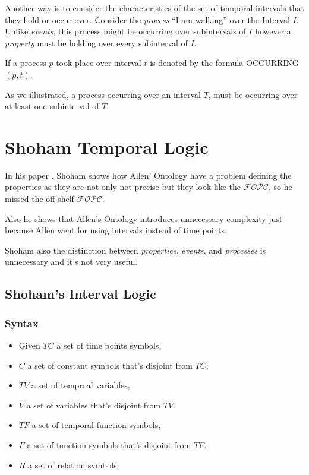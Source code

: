 Another way is to consider the characteristics of the set of temporal intervals that they hold or occur over.
Consider the \textit{process} ``I am walking'' over the Interval $I$. Unlike \textit{events}, this process might be occurring over subintervals of $I$ however a \textit{property} must be holding over every subinterval of $I$.


If a process $p$ took place over interval $t$ is denoted by the formula OCCURRING$(p,t)$.


As we illustrated, a process occurring over an interval $T$, must be occurring over at least one subinterval of $T$.

\section{Shoham Temporal Logic}

In his paper \cite{shoham1988temporal}.
Shoham shows how Allen' Ontology have a problem defining the properties as they are not only not precise but they look like the $\mathcal{FOPC}$, so he missed the-off-shelf $\mathcal{FOPC}$.

Also he shows that Allen's Ontology introduces unnecessary complexity just because Allen went for using intervals instead of time points.

Shoham also the distinction between \textit{properties}, \textit{events}, and \textit{processes} is unnecessary and it's not very useful.


\subsection{Shoham's Interval Logic}
\subsubsection{Syntax}
\begin{itemize}
	\item Given $TC$ a set of time points symbols,
	\item $C$ a set of constant symbols that's disjoint from $TC$;
	\item $TV$ a set of temproal variables,
	\item $V$ a set of variables that's disjoint from $TV$.
	\item $TF$ a set of temporal function symbols,
	\item $F$ a set of function symbols that's disjoint from $TF$.
	\item $R$ a set of relation symbols.
\end{itemize}

